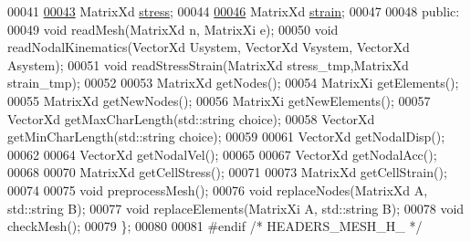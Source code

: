 \begin{DoxyCode}
00041 
\hyperlink{class_mesh_ae8f28f2627eeb9eccd9adcbdee1b2aa9}{00043}     MatrixXd \hyperlink{class_mesh_ae8f28f2627eeb9eccd9adcbdee1b2aa9}{stress};
00044 
\hyperlink{class_mesh_a602850c13e7383308be4e65acd5b30fe}{00046}     MatrixXd \hyperlink{class_mesh_a602850c13e7383308be4e65acd5b30fe}{strain};
00047 
00048 \textcolor{keyword}{public}:
00049     \textcolor{keywordtype}{void} readMesh(MatrixXd n, MatrixXi e);
00050     \textcolor{keywordtype}{void} readNodalKinematics(VectorXd Usystem, VectorXd Vsystem, VectorXd Asystem);
00051     \textcolor{keywordtype}{void} readStressStrain(MatrixXd stress\_tmp,MatrixXd strain\_tmp);
00052 
00053     MatrixXd getNodes();
00054     MatrixXi getElements();
00055     MatrixXd getNewNodes();
00056     MatrixXi getNewElements();
00057     VectorXd getMaxCharLength(std::string choice);
00058     VectorXd getMinCharLength(std::string choice);
00059 
00061     VectorXd getNodalDisp();
00062 
00064     VectorXd getNodalVel();
00065 
00067     VectorXd getNodalAcc();
00068 
00070     MatrixXd getCellStress();
00071 
00073     MatrixXd getCellStrain();
00074 
00075     \textcolor{keywordtype}{void} preprocessMesh();
00076     \textcolor{keywordtype}{void} replaceNodes(MatrixXd A, std::string B);
00077     \textcolor{keywordtype}{void} replaceElements(MatrixXi A, std::string B);
00078     \textcolor{keywordtype}{void} checkMesh();
00079 \};
00080 
00081 \textcolor{preprocessor}{#endif }\textcolor{comment}{/* HEADERS\_MESH\_H\_ */}\textcolor{preprocessor}{}
\end{DoxyCode}
